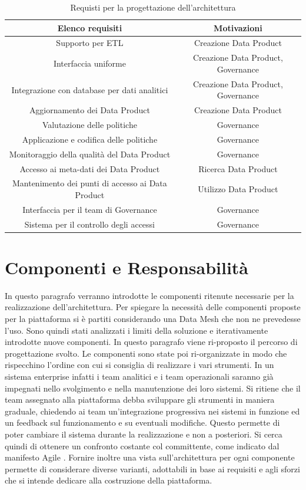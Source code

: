 \documentclass[12pt]{report}
\begin{document}
\begin{table}
    \centering
    \begin{tabular}{|c|c|}
    \hline
        Elenco requisiti & Motivazioni\\
        \hline
        Supporto per ETL & Creazione Data Product \\
        Interfaccia uniforme & Creazione Data Product, Governance\\
        Integrazione con database per dati analitici & Creazione Data Product, Governance \\
        Aggiornamento dei Data Product  & Creazione Data Product\\
        Valutazione delle politiche & Governance \\
        Applicazione e codifica delle politiche & Governance  \\
        Monitoraggio della qualità  del Data Product & Governance \\
        Accesso ai meta-dati dei Data Product & Ricerca Data Product \\
        Mantenimento dei punti di accesso ai Data Product & Utilizzo Data Product \\
        Interfaccia per il team di Governance & Governance \\
        Sistema per il controllo degli accessi & Governance \\
    \hline
    \end{tabular}
    \caption{Requisti per la progettazione dell'architettura}
    \label{tab:requisitiTec}
\end{table}
\section{Componenti e Responsabilità}\label{componenti e responsabilità}
In questo paragrafo verranno introdotte le componenti ritenute necessarie per la realizzazione dell'architettura.
Per spiegare la necessità delle componenti proposte per la piattaforma si è partiti considerando una Data Mesh che non ne prevedesse l'uso. 
Sono quindi stati analizzati i limiti della soluzione e iterativamente introdotte nuove componenti.
In questo paragrafo viene ri-proposto il percorso di progettazione svolto.
Le componenti sono state poi ri-organizzate in modo che rispecchino l'ordine con cui si consiglia di realizzare i vari strumenti.
In un sistema enterprise infatti i team analitici e i team operazionali saranno già impegnati nello svolgimento e nella manutenzione dei loro sistemi.
Si ritiene che il team assegnato alla piattaforma debba sviluppare gli strumenti in maniera graduale, chiedendo ai team un'integrazione progressiva nei sistemi in funzione ed un feedback sul funzionamento e su eventuali modifiche.
Questo permette di poter cambiare il sistema durante la realizzazione e non a posteriori.
Si cerca quindi di ottenere un confronto costante col committente, come indicato dal manifesto Agile \cite{fowler2001agile}.
Fornire inoltre una vista sull'architettura per ogni componente permette di considerare diverse varianti, adottabili in base ai requisiti e agli sforzi che si intende dedicare alla costruzione della piattaforma.
\end{document}
